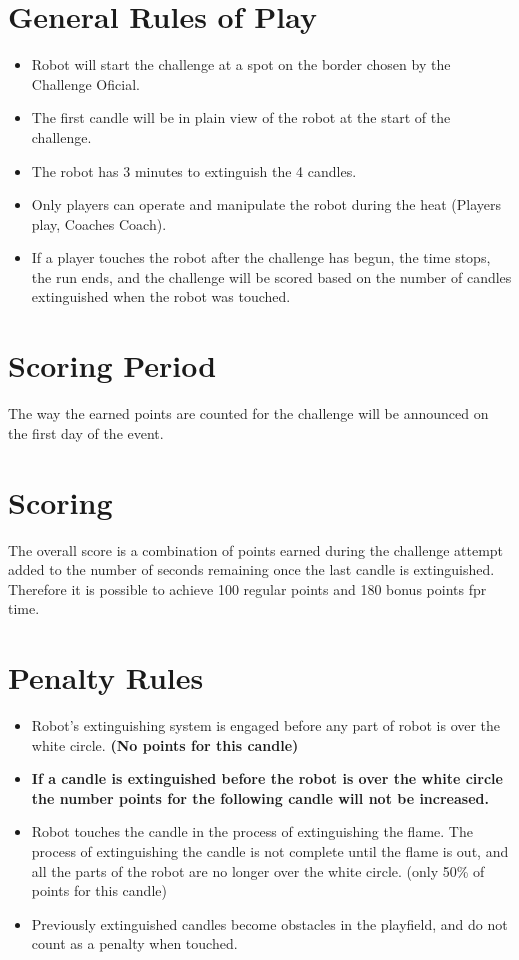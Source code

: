 \documentclass[a4paper,12pt]{article}
\begin{document}
\section{General Rules of Play}
\begin{itemize}
	\item Robot will start the challenge at a spot on the border chosen by the Challenge Oficial.
	\item The first candle will be in plain view of the robot at the start of the challenge.
	\item The robot has 3 minutes to extinguish the 4 candles.
	\item Only players can operate and manipulate the robot during the heat (Players play, Coaches Coach).
	\item If a player touches the robot after the challenge has begun, the time stops, the run ends, and the challenge will
	be scored based on the number of candles extinguished when the robot was touched.
\end{itemize}
\section{Scoring Period}
\par The way the earned points are counted for the challenge will be announced on the first day of the event.
\section{Scoring}
The overall score is a combination of points earned during the challenge attempt added to the number of
seconds remaining once the last candle is extinguished. Therefore it is possible to achieve 100 regular points and 180 bonus points fpr time.
\section{Penalty Rules}
\begin{itemize}
\item Robot’s extinguishing system is engaged before any part of robot is over the white circle. \textbf{(No points for this candle)}
\item \textbf{If a candle is extinguished before the robot is over the white circle the number points for the following candle will not be increased.}
\item Robot touches the candle in the process of extinguishing the flame. The process of
extinguishing the
candle is not complete until the flame is out, and all the parts of the robot are no longer over the white
circle. (only 50\% of points for this candle)
\item Previously extinguished candles become obstacles in the playfield, and do not count as a penalty when
touched.
\end{itemize}
\end{document}
